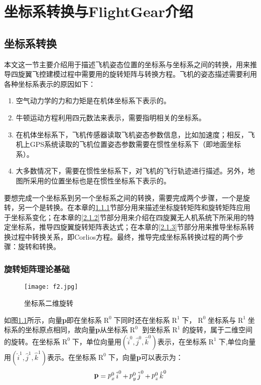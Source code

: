 \chapter{坐标系转换与FlightGear介绍}\label{introduction}
\section{坐标系转换}
本文这一节主要介绍用于描述飞机姿态位置的坐标系与坐标系之间的转换，用来推导四旋翼飞控建模过程中需要用的旋转矩阵与转换方程。飞机的姿态描述需要利用各种坐标系表示的原因如下：
\begin{enumerate}
	\item 空气动力学的力和力矩是在机体坐标系下表示的。
	\item 牛顿运动方程利用四元数法来表示，需要指明相关的坐标系。
	\item 在机体坐标系下，飞机传感器读取飞机姿态参数信息，比如加速度；相反，飞机上GPS系统读取的飞机位置姿态参数需要在惯性坐标系下（即地面坐标系）。
	\item 大多数情况下，需要在惯性坐标系下，对飞机的飞行轨迹进行描述。另外，地图所采用的位置坐标也是在惯性坐标系下表示的。
\end{enumerate}

要想完成一个坐标系到另一个坐标系之间的转换，需要完成两个步骤，一个是旋转，另一个是转换。在本章的\ref{2.1.1}节部分用来描述坐标旋转矩阵和旋转矩阵应用于坐标系变化；在本章的\ref{2.1.2}节部分用来介绍在四旋翼无人机系统下所采用的特定坐标系，推导四旋翼旋转矩阵表达式；在本章的\ref{2.1.3}节部分用来推导坐标系转换过程中转换关系，即Corlios方程。最终，推导完成坐标系转换过程的两个步骤：旋转和转换。

\subsection{旋转矩阵理论基础}\label{2.1.1}
\begin{figure}[!ht]
\centering
\texttt{[image: f2.jpg]}
\caption{坐标系二维旋转}
\label{fig2}
\end{figure}
如图\ref{fig2}所示，向量{\bf{p}}即在坐标系$\mathop R\nolimits^0$下同时还在坐标系$\mathop R\nolimits^1$下，$\mathop R\nolimits^0$坐标系与$\mathop R\nolimits^1$坐标系的坐标原点相同，故向量{\bf{p}}从坐标系$\mathop R\nolimits^0$ 到坐标系$\mathop R\nolimits^1 $的旋转，属于二维空间的旋转。在坐标系$\mathop R\nolimits^0$下，单位向量用$\left( {{{\hat i}^0},{{\hat j}^0},{{\hat k}^0}} \right)$表示，在坐标系$\mathop R\nolimits^1 $下,单位向量用$\left( {{{\hat i}^1},{{\hat j}^1},{{\hat k}^1}} \right)$表示。在坐标系$\mathop R\nolimits^0$下，向量{\bf{p}}可以表示为：
\[\mathop {\bf{p}}\limits^{}  = \mathop p\nolimits_x^0 \mathop {\hat i}\nolimits^0  + \mathop p\nolimits_y^0 \mathop {\hat j}\nolimits^0  + \mathop p\nolimits_z^0 \mathop {\hat k}\nolimits^0 \]

